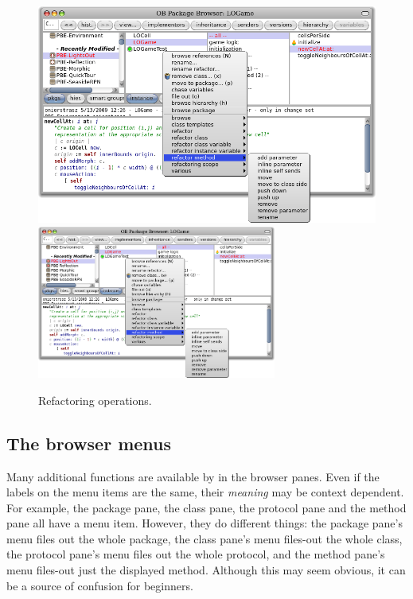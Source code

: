 \documentclass[a4paper,10pt,twoside]{book}
\begin{document}
\begin{figure}[btp]
	\begin{center}
	\ifluluelse
		{\includegraphics[width=\textwidth]{refactoring}}
		{\includegraphics[width=0.7\textwidth]{refactoring}}
	\end{center}
	\caption{Refactoring operations.}
\end{figure}

\subsection{The browser menus}

Many additional functions are available by  in the browser panes.  
Even if the labels on the menu items are the same, their \emph{meaning} may be context dependent.  
For example, the package pane, the class pane, the protocol pane and the method pane all have a  menu item.  However, they do different things: the package pane's  menu files out the whole package, the class pane's  menu files-out the whole class, the protocol pane's  menu files out the whole protocol, and the method pane's  menu files-out just the displayed method.
Although this may seem obvious, it can be a source of confusion for beginners. 
\end{document}
